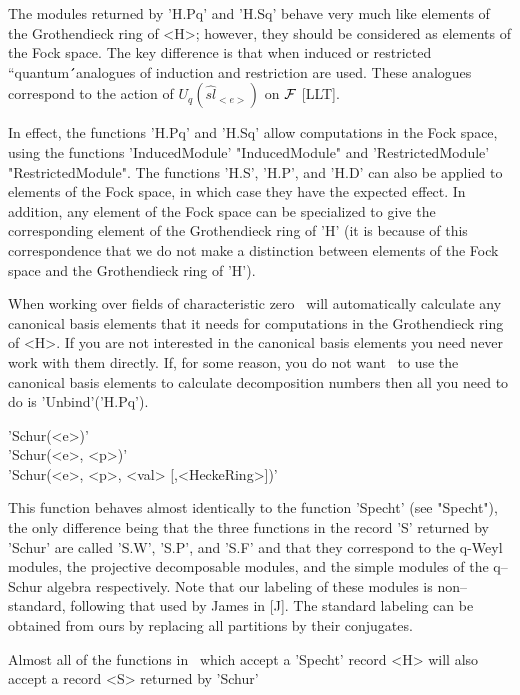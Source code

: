 The modules returned by 'H.Pq' and 'H.Sq' behave very much like elements 
of the Grothendieck ring of <H>; however, they should be considered as
elements of the Fock space. The key difference is that when induced or 
restricted ``quantum\'\'\ analogues of induction and restriction are used. 
These analogues correspond to the action of $U_q(\widehat{sl}_{<e>})$ 
on ${\cal F}$ [LLT]. 

In effect, the functions 'H.Pq' and 'H.Sq' allow computations in 
the Fock space, using the functions 'InducedModule' "InducedModule" and
'RestrictedModule' "RestrictedModule". The functions 'H.S', 'H.P', and 
'H.D' can also be applied to elements of the Fock space, in which case 
they have the expected effect. In addition, any element of the Fock space 
can be specialized to give the corresponding element of the Grothendieck 
ring of 'H' (it is because of this correspondence that we do not make a 
distinction between elements of the Fock space and the Grothendieck
ring of 'H').

When working over fields of characteristic zero \Specht\ will
automatically calculate any canonical basis elements that it needs for
computations in the Grothendieck ring of <H>. If you are not interested 
in the canonical basis elements you need never work with them directly. 
If, for some reason, you do not want \Specht\ to use the canonical basis 
elements to calculate decomposition numbers then all you need to do is
'Unbind'('H.Pq').



'Schur(<e>)'\\
'Schur(<e>, <p>)'\\
'Schur(<e>, <p>, <val> [,<HeckeRing>])'

This function behaves almost identically to the function 'Specht' (see
"Specht"), the only difference being that the three functions in the 
record 'S' returned by 'Schur' are called 'S.W', 'S.P', and 'S.F' 
and that they correspond to the q-Weyl modules, the projective 
decomposable modules, and the simple modules of the q--Schur algebra 
respectively. Note that our labeling of these modules is non--standard, 
following that used by James in [J]. The standard labeling can be 
obtained from ours by replacing all partitions by their conjugates.

Almost all of the functions in \Specht\ which accept a 'Specht'
record <H> will also accept a record <S> returned by 'Schur'

